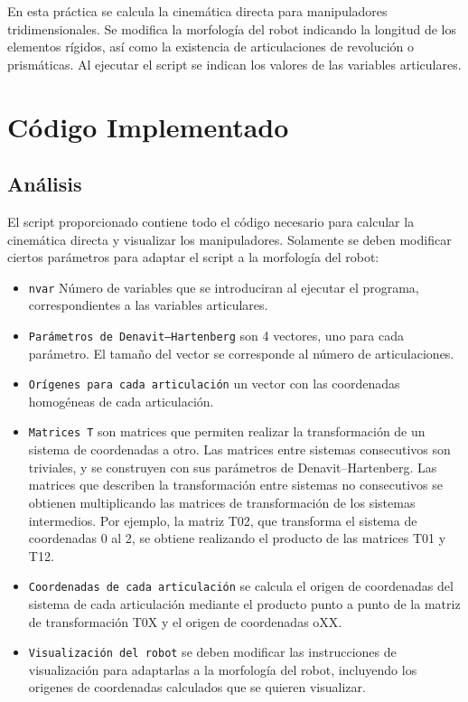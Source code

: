 En esta práctica se calcula la cinemática directa para manipuladores tridimensionales. 
Se modifica la morfología del robot indicando la longitud de los elementos rígidos, así como la existencia de articulaciones de revolución o prismáticas.
Al ejecutar el script se indican los valores de las variables articulares.

\section{Código Implementado}
\subsection{Análisis}
El script proporcionado contiene todo el código necesario para calcular la cinemática directa y visualizar los manipuladores. 
Solamente se deben modificar ciertos parámetros para adaptar el script a la morfología del robot:
\begin{itemize}
   \item \texttt{nvar} Número de variables que se introduciran al ejecutar el programa, correspondientes a las variables articulares.
   \item \texttt{Parámetros de Denavit–Hartenberg} son 4 vectores, uno para cada parámetro. El tamaño del vector se corresponde al número de articulaciones.
   \item \texttt{Orígenes para cada articulación} un vector con las coordenadas homogéneas de cada articulación.
   \item \texttt{Matrices T} son matrices que permiten realizar la transformación de un sistema de coordenadas a otro.
   Las matrices entre sistemas consecutivos son triviales, y se construyen con sus parámetros de Denavit–Hartenberg.
   Las matrices que describen la transformación entre sistemas no consecutivos se obtienen multiplicando las matrices de transformación de los sistemas intermedios.
   Por ejemplo, la matriz T02, que transforma el sistema de coordenadas 0 al 2, se obtiene realizando el producto de las matrices T01 y T12.
   \item \texttt{Coordenadas de cada articulación} se calcula el origen de coordenadas del sistema de cada articulación mediante el producto punto a punto de la matriz de transformación T0X y el origen de coordenadas oXX.
   \item \texttt{Visualización del robot} se deben modificar las instrucciones de visualización para adaptarlas a la morfología del robot, incluyendo los origenes de coordenadas calculados que se quieren visualizar.
\end{itemize}

